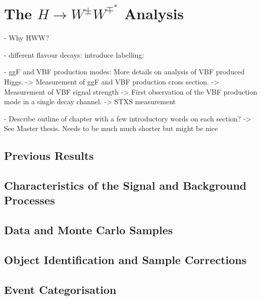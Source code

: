 \chapter{The $H\rightarrow W^{\pm}W^{\mp^*}$ Analysis}
\label{chap:hww}

- Why HWW?

- different flavour decays: introduce labelling: \HWWdet 

- ggF and VBF production modes: More details on analysis of VBF produced Higgs. 
    -> Measurement of ggF and VBF production cross section.
    -> Measurement of VBF signal strength -> First observation of the VBF production mode in a single decay channel. 
    -> STXS measurement

- Describe outline of chapter with a few introductory words on each section?
    -> See Master thesis. Needs to be much much shorter but might be nice



\section{Previous Results}
\label{sec:prev-results}



\section{Characteristics of the Signal and Background Processes}
\label{sec:signal-bkg-characteristics}



\section{Data and Monte Carlo Samples}
\label{sec:data-mc-samples}



\section{Object Identification and Sample Corrections}
\label{sec:object-selection}



\section{Event Categorisation}
\label{sec:event-categorisation}



